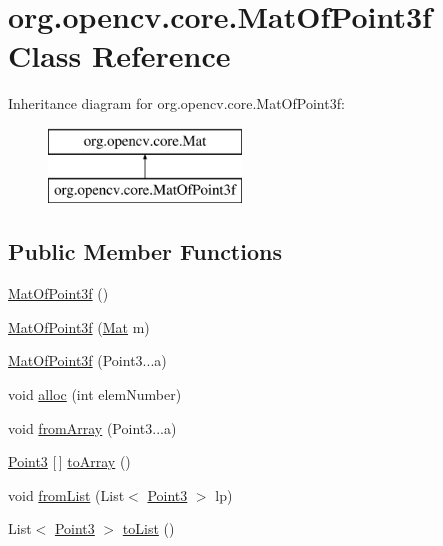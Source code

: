 \hypertarget{classorg_1_1opencv_1_1core_1_1_mat_of_point3f}{}\section{org.\+opencv.\+core.\+Mat\+Of\+Point3f Class Reference}
\label{classorg_1_1opencv_1_1core_1_1_mat_of_point3f}
Inheritance diagram for org.\+opencv.\+core.\+Mat\+Of\+Point3f\+:\begin{figure}[H]
\begin{center}
\leavevmode
\includegraphics[height=2.000000cm]{classorg_1_1opencv_1_1core_1_1_mat_of_point3f}
\end{center}
\end{figure}
\subsection*{Public Member Functions}
\begin{DoxyCompactItemize}
\item 
\mbox{\hyperlink{classorg_1_1opencv_1_1core_1_1_mat_of_point3f_afade9f774bea431175c6c3c2c55bd8eb}{Mat\+Of\+Point3f}} ()
\item 
\mbox{\hyperlink{classorg_1_1opencv_1_1core_1_1_mat_of_point3f_a9c30ce18ed5d68391458c11d8e67c6c6}{Mat\+Of\+Point3f}} (\mbox{\hyperlink{classorg_1_1opencv_1_1core_1_1_mat}{Mat}} m)
\item 
\mbox{\hyperlink{classorg_1_1opencv_1_1core_1_1_mat_of_point3f_a1e1032f7eecf3eb4e996329932d52a3d}{Mat\+Of\+Point3f}} (Point3...\+a)
\item 
void \mbox{\hyperlink{classorg_1_1opencv_1_1core_1_1_mat_of_point3f_ac9245ddf2aabe2049f9e8ac98ba8ff64}{alloc}} (int elem\+Number)
\item 
void \mbox{\hyperlink{classorg_1_1opencv_1_1core_1_1_mat_of_point3f_aee03ddc0443028c087283ecad3e09a24}{from\+Array}} (Point3...\+a)
\item 
\mbox{\hyperlink{classorg_1_1opencv_1_1core_1_1_point3}{Point3}} \mbox{[}$\,$\mbox{]} \mbox{\hyperlink{classorg_1_1opencv_1_1core_1_1_mat_of_point3f_abaaf25d71ff83988935d688b14751bff}{to\+Array}} ()
\item 
void \mbox{\hyperlink{classorg_1_1opencv_1_1core_1_1_mat_of_point3f_a5bcfdfcef450239e6672801e0f019e0b}{from\+List}} (List$<$ \mbox{\hyperlink{classorg_1_1opencv_1_1core_1_1_point3}{Point3}} $>$ lp)
\item 
List$<$ \mbox{\hyperlink{classorg_1_1opencv_1_1core_1_1_point3}{Point3}} $>$ \mbox{\hyperlink{classorg_1_1opencv_1_1core_1_1_mat_of_point3f_af2a8e61f130fd387eb33496c96f56ae8}{to\+List}} ()
\end{DoxyCompactItemize}
